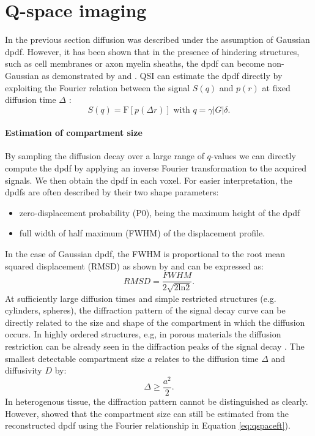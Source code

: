 \section{Q-space imaging}
\label{sec:qspace}
In the previous section diffusion was described under the assumption of Gaussian  {\gls{dpdf}}. However, it has been shown that in the presence of hindering structures, such as cell membranes or axon myelin sheaths, the  {\gls{dpdf}} can become non-Gaussian as demonstrated by \citet{Callaghan:1996} and \citet{Liu:2005}. \gls{QSI} can estimate the  {\gls{dpdf}} directly by exploiting the Fourier relation between the signal $S(q)$ and $p(r)$ at fixed diffusion time $\Delta$ \citep{Callaghan:1994}:
\begin{equation}
	\label{eq:qspaceft}
	S(q)=\mbox{F}\left[p(\Delta r)\right] \mbox{ with } q = \gamma|G|\delta. 
\end{equation}
\paragraph*{Estimation of compartment size}
By sampling the diffusion decay over a large range of $q$-values we can directly compute the  {\gls{dpdf}} by applying an inverse Fourier transformation to the acquired signals. We then obtain the  {\gls{dpdf}} in each voxel. For easier interpretation, the  {\gls{dpdf}}s are often described by their two shape parameters:
\begin{itemize}
	\item zero-displacement probability (\gls{P0}), being the maximum height of the  {\gls{dpdf}}
	\item full width of half maximum (\gls{FWHM}) of the displacement profile.
\end{itemize}
In the case of Gaussian  {\gls{dpdf}}, the \gls{FWHM} is proportional to the root mean squared displacement (RMSD) as shown by \citet{Cory:1990} and can be expressed as:
\begin{equation}
	RMSD = \frac{FWHM}{2\sqrt{2\mbox{ln}2}}.
\end{equation}
At sufficiently large diffusion times and simple restricted structures (e.g. cylinders, spheres), the diffraction pattern of the signal decay curve can be directly related to the size and shape of the compartment in which the diffusion occurs. In highly ordered structures, e.g, in porous materials the diffusion restriction can be already seen in the diffraction peaks of the signal decay \citep{Callaghan:1996}. The smallest detectable compartment size $a$ relates to the diffusion time $\Delta$ and diffusivity $D$ by:
\begin{equation}
	\Delta \ge \frac{a^2}{2}.
\end{equation}   
In heterogenous tissue, the diffraction pattern cannot be distinguished as clearly. However, \citet{Cory:1990} showed that the compartment size can still be estimated from the reconstructed  {\gls{dpdf}} using the Fourier relationship in Equation \ref{eq:qspaceft}). 
